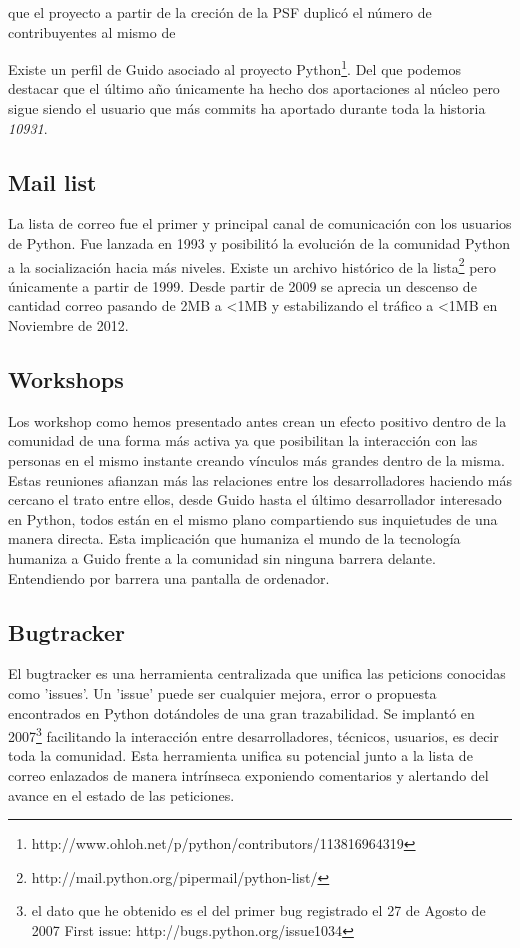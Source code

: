 \documentclass[11pt]{scrartcl}
\begin{document}
que el proyecto a partir de la creción de la PSF duplicó el número de contribuyentes al mismo de 

Existe un perfil de Guido asociado al proyecto Python\footnote{http://www.ohloh.net/p/python/contributors/113816964319}. Del que podemos destacar que el último año únicamente ha hecho dos aportaciones al núcleo pero sigue siendo el usuario que más commits ha aportado durante toda la historia \emph{10931}.

\subsection{Mail list}

La lista de correo fue el primer y principal canal de comunicación con los usuarios de Python. Fue lanzada en 1993 y posibilitó la evolución de la comunidad Python a la socialización hacia más niveles. Existe un archivo histórico de la lista\footnote{http://mail.python.org/pipermail/python-list/} pero únicamente a partir de 1999. Desde partir de 2009 se aprecia un descenso de cantidad correo pasando de 2MB a <1MB y estabilizando el tráfico a <1MB en Noviembre de 2012.

\subsection{Workshops}

Los workshop como hemos presentado antes crean un efecto positivo dentro de la comunidad de una forma más activa ya que posibilitan la interacción con las personas en el mismo instante creando vínculos más grandes dentro de la misma. Estas reuniones afianzan más las relaciones entre los desarrolladores haciendo más cercano el trato entre ellos, desde Guido hasta el último desarrollador interesado en Python, todos están en el mismo plano compartiendo sus inquietudes de una manera directa. Esta implicación que humaniza el mundo de la tecnología humaniza a Guido frente a la comunidad sin ninguna barrera delante. Entendiendo por barrera una pantalla de ordenador.

\subsection{Bugtracker}

El bugtracker es una herramienta centralizada que unifica las peticions conocidas como 'issues'. Un 'issue' puede ser cualquier mejora, error o propuesta encontrados en Python dotándoles de una gran trazabilidad. Se implantó en 2007\footnote{el dato que he obtenido es el del primer bug registrado el 27 de Agosto de 2007 First issue: http://bugs.python.org/issue1034} facilitando la interacción entre desarrolladores, técnicos, usuarios, es decir toda la comunidad. Esta herramienta unifica su potencial junto a la lista de correo enlazados de manera intrínseca exponiendo comentarios y alertando del avance en el estado de las peticiones.
\end{document}
